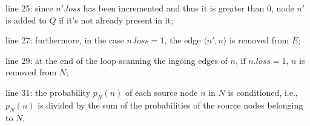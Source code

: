 \begin{frame}
\begin{columns}
  \begin{sitemize}
    \item line 25: since $n'.loss$ has been incremented and thus it is greater than 0, node $n'$ is added to $Q$ if it's not already present in it;
    \item line 27: furthermore, in the case $n.loss = 1$, the edge $\langle n',n \rangle$ is removed from $E$;
    \item line 29: at the end of the loop scanning the ingoing edges of $n$, if $n.loss = 1$, $n$ is removed from $N$;
    \item line 31: the probability $p_N(n)$ of each source node $n$ in $N$ is conditioned, i.e., $p_N(n)$ is divided by the sum of the probabilities of the source nodes belonging to $N$.
  \end{sitemize}

\end{columns}


\end{frame}


